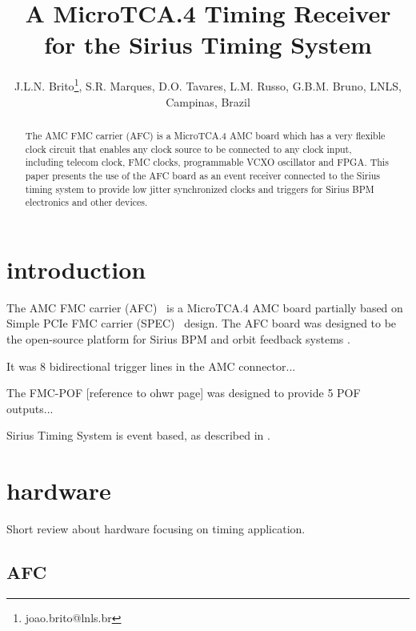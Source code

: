 \documentclass[a4paper,
               biblatex,      %
               ]{jacow}
\begin{document}
\title{A MicroTCA.4  Timing Receiver for the Sirius Timing System}

\author{J.L.N. Brito\thanks{joao.brito@lnls.br}, S.R. Marques, D.O. Tavares, L.M. Russo, G.B.M. Bruno, LNLS, Campinas, Brazil}
	
\maketitle

%
\begin{abstract}
   The AMC FMC carrier (AFC) is a MicroTCA.4 AMC board which has a very flexible clock circuit that enables any clock source to be connected to any clock input, including telecom clock, FMC clocks, programmable VCXO oscillator and FPGA. This paper presents the use of the AFC board as an event receiver connected to the Sirius timing system to provide low jitter synchronized clocks and triggers for Sirius BPM electronics and other devices.
\end{abstract}


\section{introduction}
The AMC FMC carrier (AFC)~\cite{afc-git} is a MicroTCA.4 AMC board partially based on Simple PCIe FMC carrier (SPEC)~\cite{spec} design. 
The AFC board was designed to be the open-source platform for Sirius BPM and orbit feedback systems \cite{ebpm_icalepcs13}.

It was 8 bidirectional trigger lines in the AMC connector...

The FMC-POF [reference to ohwr page] was designed to provide 5 POF outputs...

Sirius Timing System is event based, as described in \cite{timing_icalepcs15}.

\section{hardware}
Short review about hardware focusing on timing application.

\subsection{AFC}
\end{document}
